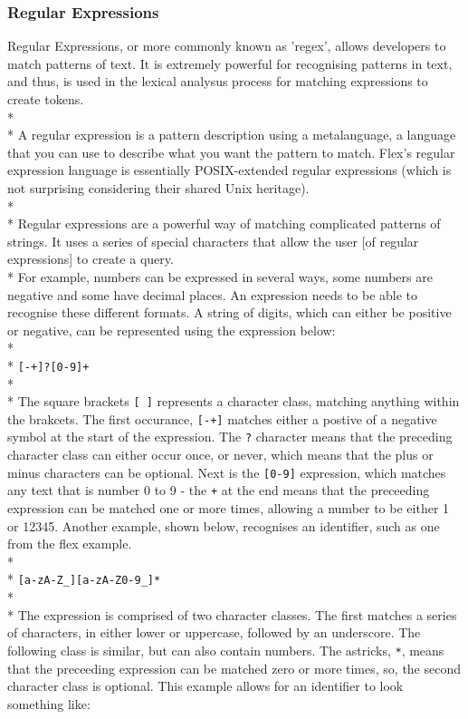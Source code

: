 \documentclass[12pt]{report}
\begin{document}
\subsubsection{Regular Expressions}\label{subsubsec:regex}
Regular Expressions, or more commonly known as 'regex', allows developers to match patterns of text.  It is extremely powerful for recognising patterns in text, and thus, is used in the lexical analysus process for matching expressions to create tokens.
\\*
\\*
A regular expression is a pattern description using a metalanguage, a language that you can use to describe what you want the pattern to match.  Flex's regular expression language is essentially POSIX-extended regular expressions (which is not surprising considering their shared Unix heritage).\citep{flexandbison09}
\\*
\\*
Regular expressions are a powerful way of matching complicated patterns of strings.  It uses a series of special characters that allow the user [of regular expressions] to create a query.
\\*
For example, numbers can be expressed in several ways, some numbers are negative and some have decimal places.  An expression needs to be able to recognise these different formats.  A string of digits, which can either be positive or negative, can be represented using the expression below:\\*
\\*
\texttt{[-+]?[0-9]+}
\\*
\\*
The square brackets \texttt{[ ]} represents a character class, matching anything within the brakcets.  The first occurance, \texttt{[-+]} matches either a postive of a negative symbol at the start of the expression.  The \texttt{?} character means that the preceding character class can either occur once, or never, which means that the plus or minus characters can be optional.  Next is the \texttt{[0-9]} expression, which matches any text that is number 0 to 9 - the \texttt{+} at the end means that the preceeding expression can be matched one or more times, allowing a number to be either 1 or 12345.  Another example, shown below, recognises an identifier, such as one from the flex example.
\\*
\\*
\texttt{[a-zA-Z\_][a-zA-Z0-9\_]*}
\\*
\\*
The expression is comprised of two character classes.  The first matches a series of characters, in either lower or uppercase, followed by an underscore. The following class is similar, but can also contain numbers.  The astricks, \texttt{*}, means that the preceeding expression can be matched zero or more times, so, the second character class is optional.  This example allows for an identifier to look something like:\\
\end{document}
